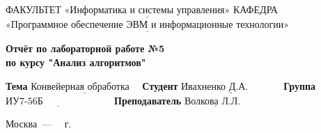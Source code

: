 \begin{titlepage}
	
	\noindent ФАКУЛЬТЕТ $\underline{\text{«Информатика и системы управления»}}$ \newline\newline
	\noindent КАФЕДРА $\underline{\text{«Программное обеспечение ЭВМ и информационные технологии»}}$\newline\newline\newline\newline\newline\newline\newline
	
	\vspace{\baselineskip}

	\begin{center}
		\noindent\begin{minipage}{0.71\textwidth}\centering
			\Large\textbf{Отчёт по лабораторной работе №5\\по курсу "Анализ алгоритмов"}\newline\newline
		\end{minipage}
	\end{center}

	\noindent\textbf{Тема} $\underline{\text{Конвейерная обработка~~~}}$\newline\newline\newline
	\noindent\textbf{Студент} $\underline{\text{Ивахненко Д.А.~~~~~~~~~~}}$\newline\newline
	\noindent\textbf{Группа} $\underline{\text{ИУ7-56Б~~~~~~~~~~~~~~~~~~~~~}}$\newline\newline
	\noindent\textbf{Преподаватель} $\underline{\text{Волкова Л.Л.~~}}$\newline
	
	\begin{center}
		\vfill
		Москва~---~\the\year
		~г.
	\end{center}
 \restoregeometry
\end{titlepage}